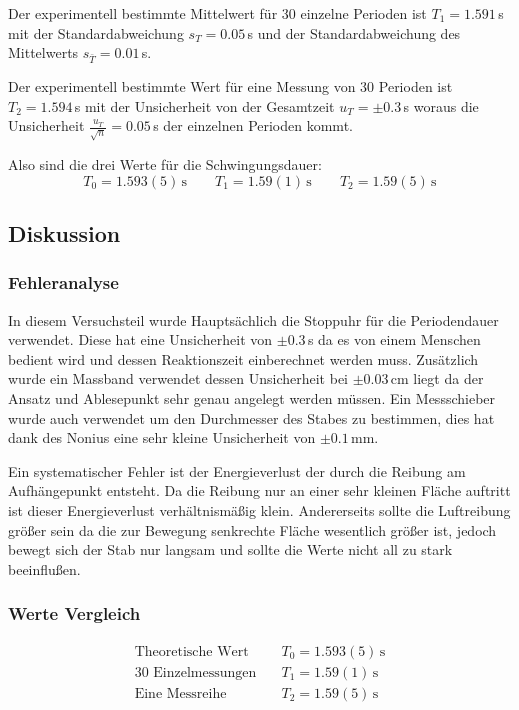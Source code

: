\documentclass[11pt,a4paper]{article}
\begin{document}
Der experimentell bestimmte Mittelwert für 30 einzelne Perioden ist $T_1 = 1.591$\,s mit der Standardabweichung $s_T = 0.05$\,s und der Standardabweichung des Mittelwerts $s_{\bar T} = 0.01$\,s. 

Der experimentell bestimmte Wert für eine Messung von 30 Perioden ist $T_2 = 1.594\,$s mit der Unsicherheit von der Gesamtzeit $u_T = \pm0.3$\,s woraus die Unsicherheit $\frac{u_T}{\sqrt{n}} = 0.05$\,s der einzelnen Perioden kommt.

Also sind die drei Werte für die Schwingungsdauer:
$$T_0 = 1.593(5)\,\textrm{s} \qquad T_1 = 1.59(1)\,\textrm{s} \qquad T_2 = 1.59(5)\,\textrm{s}$$

\subsection{Diskussion}
\subsubsection{Fehleranalyse}

In diesem Versuchsteil wurde Hauptsächlich die Stoppuhr für die Periodendauer verwendet. Diese hat eine Unsicherheit von $\pm0.3$\,s da es von einem Menschen bedient wird und dessen Reaktionszeit einberechnet werden muss. Zusätzlich wurde ein Massband verwendet dessen Unsicherheit bei $\pm0.03\,$cm liegt da der Ansatz und Ablesepunkt sehr genau angelegt werden müssen. Ein Messschieber wurde auch verwendet um den Durchmesser des Stabes zu bestimmen, dies hat dank des Nonius eine sehr kleine Unsicherheit von $\pm0.1\,$mm. 

Ein systematischer Fehler ist der Energieverlust der durch die Reibung am Aufhängepunkt entsteht. Da die Reibung nur an einer sehr kleinen Fläche auftritt ist dieser Energieverlust verhältnismäßig klein. Andererseits sollte die Luftreibung größer sein da die zur Bewegung senkrechte Fläche wesentlich größer ist, jedoch bewegt sich der Stab nur langsam und sollte die Werte nicht all zu stark beeinflußen.

\subsubsection{Werte Vergleich}
 
\begin{align*}
	\textrm{Theoretische Wert} \quad & T_0 = 1.593(5)\,\textrm{s}\\
	\textrm{30 Einzelmessungen} \quad & T_1 = 1.59(1)\,\textrm{s}\\
	\textrm{Eine Messreihe} \quad & T_2 = 1.59(5)\,\textrm{s}
\end{align*}
\end{document}

